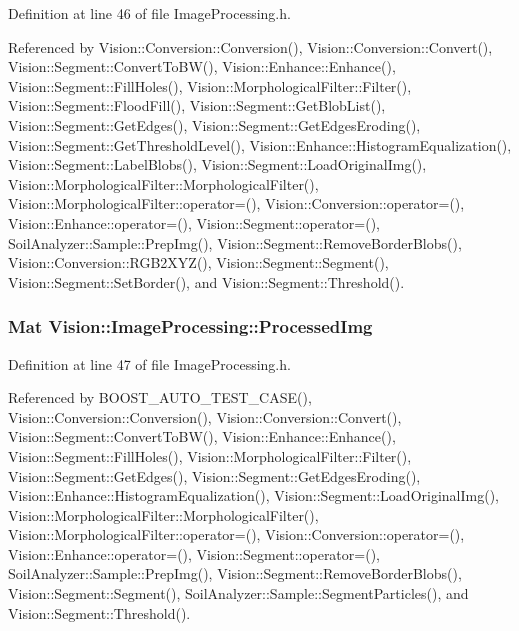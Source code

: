 Definition at line 46 of file Image\+Processing.\+h.



Referenced by Vision\+::\+Conversion\+::\+Conversion(), Vision\+::\+Conversion\+::\+Convert(), Vision\+::\+Segment\+::\+Convert\+To\+B\+W(), Vision\+::\+Enhance\+::\+Enhance(), Vision\+::\+Segment\+::\+Fill\+Holes(), Vision\+::\+Morphological\+Filter\+::\+Filter(), Vision\+::\+Segment\+::\+Flood\+Fill(), Vision\+::\+Segment\+::\+Get\+Blob\+List(), Vision\+::\+Segment\+::\+Get\+Edges(), Vision\+::\+Segment\+::\+Get\+Edges\+Eroding(), Vision\+::\+Segment\+::\+Get\+Threshold\+Level(), Vision\+::\+Enhance\+::\+Histogram\+Equalization(), Vision\+::\+Segment\+::\+Label\+Blobs(), Vision\+::\+Segment\+::\+Load\+Original\+Img(), Vision\+::\+Morphological\+Filter\+::\+Morphological\+Filter(), Vision\+::\+Morphological\+Filter\+::operator=(), Vision\+::\+Conversion\+::operator=(), Vision\+::\+Enhance\+::operator=(), Vision\+::\+Segment\+::operator=(), Soil\+Analyzer\+::\+Sample\+::\+Prep\+Img(), Vision\+::\+Segment\+::\+Remove\+Border\+Blobs(), Vision\+::\+Conversion\+::\+R\+G\+B2\+X\+Y\+Z(), Vision\+::\+Segment\+::\+Segment(), Vision\+::\+Segment\+::\+Set\+Border(), and Vision\+::\+Segment\+::\+Threshold().

\hypertarget{class_vision_1_1_image_processing_aa7d65742882cd1b2a1e4e9cb68809211}{}
\subsubsection[{Processed\+Img}]{\setlength{\rightskip}{0pt plus 5cm}Mat Vision\+::\+Image\+Processing\+::\+Processed\+Img}\label{class_vision_1_1_image_processing_aa7d65742882cd1b2a1e4e9cb68809211}


Definition at line 47 of file Image\+Processing.\+h.



Referenced by B\+O\+O\+S\+T\+\_\+\+A\+U\+T\+O\+\_\+\+T\+E\+S\+T\+\_\+\+C\+A\+S\+E(), Vision\+::\+Conversion\+::\+Conversion(), Vision\+::\+Conversion\+::\+Convert(), Vision\+::\+Segment\+::\+Convert\+To\+B\+W(), Vision\+::\+Enhance\+::\+Enhance(), Vision\+::\+Segment\+::\+Fill\+Holes(), Vision\+::\+Morphological\+Filter\+::\+Filter(), Vision\+::\+Segment\+::\+Get\+Edges(), Vision\+::\+Segment\+::\+Get\+Edges\+Eroding(), Vision\+::\+Enhance\+::\+Histogram\+Equalization(), Vision\+::\+Segment\+::\+Load\+Original\+Img(), Vision\+::\+Morphological\+Filter\+::\+Morphological\+Filter(), Vision\+::\+Morphological\+Filter\+::operator=(), Vision\+::\+Conversion\+::operator=(), Vision\+::\+Enhance\+::operator=(), Vision\+::\+Segment\+::operator=(), Soil\+Analyzer\+::\+Sample\+::\+Prep\+Img(), Vision\+::\+Segment\+::\+Remove\+Border\+Blobs(), Vision\+::\+Segment\+::\+Segment(), Soil\+Analyzer\+::\+Sample\+::\+Segment\+Particles(), and Vision\+::\+Segment\+::\+Threshold().

